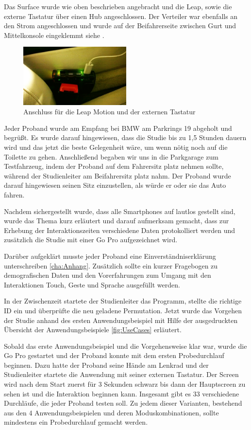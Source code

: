 Das Surface wurde wie oben beschrieben angebracht und die Leap, sowie die externe Tastatur über einen Hub angeschlossen. Der Verteiler war ebenfalls an den Strom angeschlossen und wurde auf der Beifahrerseite zwischen Gurt und Mittelkonsole eingeklemmt siehe . 
\begin{figure}[ht]
  \centering
  \includegraphics[width=0.5\textwidth]{img/Hub.jpg}
  \caption{Anschluss für die Leap Motion und der externen Tastatur}
  \label{fig:Hub}
\end{figure} 

Jeder Proband wurde am Empfang bei BMW am Parkrings 19 abgeholt und begrüßt.
Es wurde darauf hingewiesen, dass die Studie bis zu 1,5 Stunden dauern wird und das jetzt die beste Gelegenheit wäre, um wenn nötig noch auf die Toilette zu gehen.
Anschließend begaben wir uns in die Parkgarage zum Testfahrzeug, indem der Proband auf dem Fahrersitz platz nehmen sollte, während der Studienleiter am Beifahrersitz platz nahm.
Der Proband wurde darauf hingewiesen seinen Sitz einzustellen, als würde er oder sie das Auto fahren.

Nachdem sichergestellt wurde, dass alle Smartphones auf lautlos gestellt sind, wurde das Thema kurz erläutert und darauf aufmerksam gemacht, dass zur Erhebung der Interaktionszeiten verschiedene Daten protokolliert werden und zusätzlich die Studie mit einer Go Pro aufgezeichnet wird.

Darüber aufgeklärt musste jeder Proband eine Einverständniserklärung unterschreiben \ref{cha:Anhang}.
Zusätzlich sollte ein kurzer Fragebogen zu demografischen Daten und den Vorerfahrungen zum Umgang mit den Interaktionen Touch, Geste und Sprache ausgefüllt werden.

In der Zwischenzeit startete der Studienleiter das Programm, stellte die richtige ID ein und überprüfte die neu geladene Permutation.
Jetzt wurde das Vorgehen der Studie anhand des ersten Anwendungsbeispiel mit Hilfe der ausgedruckten Übersicht der Anwendungsbeispiele \ref{fig:UseCases} erläutert.

Sobald das erste Anwendungsbeispiel und die Vorgehensweise klar war, wurde die Go Pro gestartet und der Proband konnte mit dem ersten Probedurchlauf beginnen. Dazu hatte der Proband seine Hände am Lenkrad und der Studienleiter startete die Anwendung mit seiner externen Tastatur. 
Der Screen wird nach dem Start zuerst für 3 Sekunden schwarz bis dann der Hauptscreen zu sehen ist und die Interaktion beginnen kann.
Insgesamt gibt es 33 verschiedene Durchläufe, die jeder Proband testen soll.
Zu jedem dieser Varianten, bestehend aus den 4 Anwendungsbeispielen und deren Moduskombinationen, sollte mindestens ein Probedurchlauf gemacht werden.

